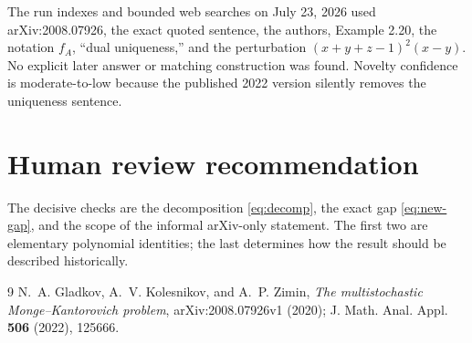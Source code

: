 \documentclass[11pt]{article}
\begin{document}
The run indexes and bounded web searches on July 23, 2026 used
arXiv:2008.07926, the exact quoted sentence, the authors, Example 2.20,
the notation $f_A$, ``dual uniqueness,'' and the perturbation
$(x+y+z-1)^2(x-y)$. No explicit later answer or matching construction was
found. Novelty confidence is moderate-to-low because the published 2022
version silently removes the uniqueness sentence.

\section{Human review recommendation}

The decisive checks are the decomposition \eqref{eq:decomp}, the exact gap
\eqref{eq:new-gap}, and the scope of the informal arXiv-only statement. The
first two are elementary polynomial identities; the last determines how the
result should be described historically.

\begin{thebibliography}{9}
N.~A. Gladkov, A.~V. Kolesnikov, and A.~P. Zimin,
\emph{The multistochastic Monge--Kantorovich problem},
arXiv:2008.07926v1 (2020); J. Math. Anal. Appl. \textbf{506} (2022),
125666.
\end{thebibliography}
\end{document}
